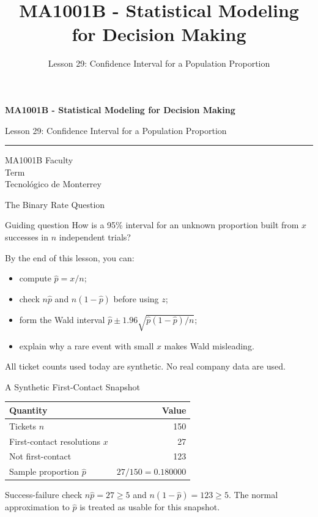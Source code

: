 \documentclass[aspectratio=169,10pt,english]{beamer}
\title{MA1001B - Statistical Modeling for Decision Making}
\subtitle{Lesson 29: Confidence Interval for a Population Proportion}
\author{}
\institute{Tecnol\'ogico de Monterrey}
\date{}
\begin{document}
\begin{frame}[plain]
  \vspace{1.2cm}
  {\Large\bfseries MA1001B - Statistical Modeling for Decision Making\par}
  \vspace{0.7cm}
  {\large Lesson 29: Confidence Interval for a Population Proportion\par}
  \vspace{0.7cm}
  {\color{TecRojo}\rule{\textwidth}{1.2pt}}
  \vspace{0.8cm}

  MA1001B Faculty\\[0.3cm]
  Term\\[0.3cm]
  Tecnol\'ogico de Monterrey
\end{frame}

\begin{frame}{The Binary Rate Question}
  \begin{alertblock}{Guiding question}
    How is a 95\% interval for an unknown proportion built from $x$ successes
    in $n$ independent trials?
  \end{alertblock}

  \vspace{0.6em}
  By the end of this lesson, you can:
  \begin{itemize}
    \item compute $\hat{p}=x/n$;
    \item check $n\hat{p}$ and $n(1-\hat{p})$ before using $z$;
    \item form the Wald interval $\hat{p}\pm 1.96\sqrt{\hat{p}(1-\hat{p})/n}$;
    \item explain why a rare event with small $x$ makes Wald misleading.
  \end{itemize}

  \vfill
  \scriptsize All ticket counts used today are synthetic. No real company data are used.
\end{frame}

\begin{frame}{A Synthetic First-Contact Snapshot}
  \small
  \begin{center}
    \begin{tabular}{lr}
      \toprule
      \textbf{Quantity} & \textbf{Value} \\
      \midrule
      Tickets $n$ & 150 \\
      First-contact resolutions $x$ & 27 \\
      Not first-contact & 123 \\
      Sample proportion $\hat{p}$ & $27/150=0.180000$ \\
      \bottomrule
    \end{tabular}
  \end{center}

  \vspace{0.5em}
  \begin{exampleblock}{Success-failure check}
    $n\hat{p}=27\ge 5$ and $n(1-\hat{p})=123\ge 5$. The normal approximation
    to $\hat{p}$ is treated as usable for this snapshot.
  \end{exampleblock}
\end{frame}
\end{document}
